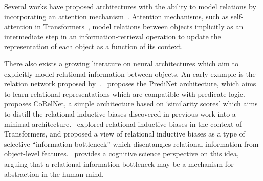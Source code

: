 Several works have proposed architectures with the ability to model relations by incorporating an {attention mechanism}~\citep[e.g.,][]{vaswani2017attention,locatelloObjectCentricLearningSlot2020,santoroRelationalRecurrent2018,zambaldiDeepReinforcementLearning2018,velickovicGraphAttentionNetworks2017}. Attention mechanisms, such as self-attention in Transformers~\cite{vaswani2017attention}, model relations between objects implicitly as an intermediate step in an information-retrieval operation
to update the representation of each object as a function of its context.

There also exists a growing literature on neural architectures which aim to explicitly model relational information between objects. An early example is the relation network proposed by~\citet{santoroSimpleNeural2017}.~\citet{shanahanExplicitlyRelationalNeural} proposes the PrediNet architecture, which aims to learn relational representations which are compatible with predicate logic.
~\citet{kergNeuralArchitecture2022} proposes CoRelNet, a simple architecture based on `similarity scores' which aims to distill the relational inductive biases discovered in previous work into a minimal architecture.~\citet{altabaaAbstractorsTransformer2023} explored relational inductive biases in the context of Transformers, and proposed a view of relational inductive biases as a type of selective ``information bottleneck'' which disentangles relational information from object-level features.~\citet{webbRelationalBottleneckInductive2023} provides a cognitive science perspective on this idea, arguing that a relational information bottleneck may be a mechanism for abstraction in the human mind.%

